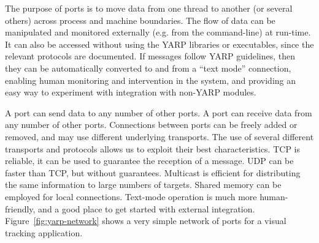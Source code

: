 The purpose of ports is to move data from one thread to another (or
several others) across process and machine boundaries. The flow of
data can be manipulated and monitored externally (e.g. from the
command-line) at run-time.  It can also be accessed without
using the YARP libraries or executables, since the relevant protocols
are documented.  If messages follow YARP guidelines, then they can be
automatically converted to and from a ``text mode'' connection, 
enabling human monitoring and intervention in the system,
and providing an easy way to experiment with integration with
non-YARP modules.

A port can send data to any number of other ports. A port can receive
data from any number of other ports. Connections between ports can be
freely added or removed, and may use different underlying transports.
The use of several different transports
and protocols allows us to exploit their best
characteristics.  TCP is reliable, it can be used to guarantee the
reception of a message.  UDP can be faster than TCP, but without
guarantees.  Multicast is efficient for distributing the same
information to large numbers of targets.  Shared memory can be
employed for local connections.  Text-mode operation is much
more human-friendly, and a good place to get started with
external integration.
Figure~\ref{fig:yarp-network} shows a very simple network of ports
for a visual tracking application.







